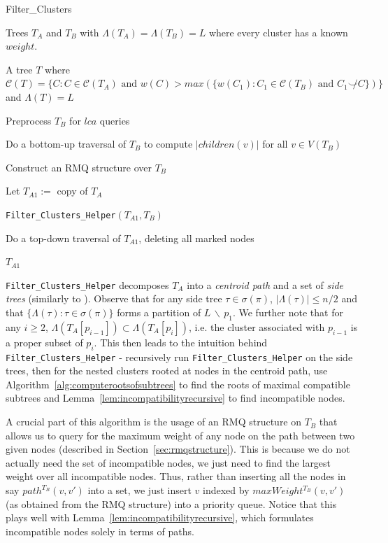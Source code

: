 \documentclass{article}
\newcommand{\compatible}{\smile}
\newcommand{\leafset}{\Lambda}
\begin{document}
    \begin{algorithm}
        \caption{Filter\_Clusters}
        \begin{algorithmic}[1]
            \Input Trees $T_A$ and $T_B$ with $\leafset(T_A) = \leafset(T_B) = L$ where every cluster has a known $weight$.

            \Output A tree $T$ where $\mathcal{C}(T) = \{C : C \in \mathcal{C}(T_A) \text{ and } w(C) > max(\{w(C_1) : C_1 \in \mathcal{C}(T_B) \text{ and } C_1 \not\compatible C\})\}$ and $\leafset(T) = L$

            \State Preprocess $T_B$ for $lca$ queries

            \State Do a bottom-up traversal of $T_B$ to compute $|children(v)|$ for all $v \in V(T_B)$

            \State Construct an RMQ structure over $T_B$

            \State Let $T_{A1} :=$ copy of $T_A$

            \State \texttt{Filter\_Clusters\_Helper}$(T_{A1}, T_B)$

            \State Do a top-down traversal of $T_{A1}$, deleting all marked nodes

            \State \Return $T_{A1}$
        \end{algorithmic}
    \end{algorithm}

    \texttt{Filter\_Clusters\_Helper} decomposes $T_A$ into a \textit{centroid path} and a set of \textit{side trees} (similarly to \cite{jansson2018algorithms}). Observe that for any side tree $\tau \in \sigma(\pi)$, $|\leafset(\tau)| \leq n/2$ and that $\{\leafset(\tau) : \tau \in \sigma(\pi)\}$ forms a partition of $L\, \backslash\, {p_1}$. We further note that for any $i \geq 2$, $\leafset(T_A[p_{i - 1}]) \subset \leafset(T_A[p_i])$, i.e. the cluster associated with $p_{i-1}$ is a proper subset of $p_i$. This then leads to the intuition behind \texttt{Filter\_Clusters\_Helper} - recursively run \texttt{Filter\_Clusters\_Helper} on the side trees, then for the nested clusters rooted at nodes in the centroid path, use Algorithm~\ref{alg:computerootsofsubtrees} to find the roots of maximal compatible subtrees and Lemma~\ref{lem:incompatibilityrecursive} to find incompatible nodes.

    A crucial part of this algorithm is the usage of an RMQ structure on $T_B$ that allows us to query for the maximum weight of any node on the path between two given nodes (described in Section~\ref{sec:rmqstructure}). This is because we do not actually need the set of incompatible nodes, we just need to find the largest weight over all incompatible nodes. Thus, rather than inserting all the nodes in say $path^{T_B}(v, v')$ into a set, we just insert $v$ indexed by $maxWeight^{T_B}(v, v')$ (as obtained from the RMQ structure) into a priority queue. Notice that this plays well with Lemma~\ref{lem:incompatibilityrecursive}, which formulates incompatible nodes solely in terms of paths.
\end{document}
